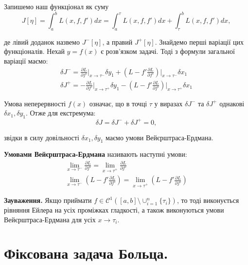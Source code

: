 \documentclass[14pt]{extarticle}
\newcommand{\<}{\langle}
\renewcommand{\>}{\rangle}
\theoremstyle{mystyle}{\newtheorem{definition}{Definition}[section]}
\theoremstyle{mystyle}{\newtheorem{proposition}[definition]{Proposition}}
\theoremstyle{mystyle}{\newtheorem{theorem}[definition]{Theorem}}
\theoremstyle{mystyle}{\newtheorem{lemma}[definition]{Lemma}}
\theoremstyle{mystyle}{\newtheorem{corollary}[definition]{Corollary}}
\theoremstyle{mystyle}{\newtheorem*{remark}{Remark}}
\theoremstyle{mystyle}{\newtheorem*{remarks}{Remarks}}
\theoremstyle{mystyle}{\newtheorem*{example}{Example}}
\theoremstyle{mystyle}{\newtheorem*{examples}{Examples}}
\theoremstyle{definition}{\newtheorem*{exercise}{Exercise}}
\theoremstyle{cstyle}{\newtheorem*{cthm}{}}
\theoremstyle{warn}
\begin{document}
Запишемо наш функціонал як суму
\begin{equation}
    J[\eta] = \int_a^b L(x,f,f')dx = \int_a^{\tau}L(x,f,f')dx + \int_{\tau}^b L(x,f,f')dx,
\end{equation}

де лівий доданок назвемо $J^{-}[\eta]$, а правий $J^{+}[\eta]$. Знайдемо перші варіації цих функціоналів.
Нехай $y=f(x)$ є розв'язком задачі. Тоді з формули загальної варіації маємо:
\begin{gather}
    \delta J^{-} = \frac{\partial L}{\partial f'}\Big|_{x \to \tau^{-}}\delta y_1 + \left(L-f'\frac{\partial L}{\partial f'}\right)\Big|_{x \to \tau^-}\delta x_1 \\
    \delta J^{+} = -\frac{\partial L}{\partial f'}\Big|_{x \to \tau^{+}}\delta y_1 - \left(L-f'\frac{\partial L}{\partial f'}\right)\Big|_{x \to \tau^+}\delta x_1 
\end{gather}

Умова неперервності $f(x)$ означає, що в точці $\tau$ у виразах $\delta J^{-}$ та $\delta J^{+}$ однакові $\delta x_1,\delta y_1$. Отже для екстремума:
\begin{equation}
    \delta J = \delta J^{-} + \delta J^{+} = 0,
\end{equation}

звідки в силу довільності $\delta x_1,\delta y_1$ маємо умови Вейєрштраса-Ердмана.

\begin{definition}
\textbf{Умовами Вейєрштраса-Ердмана} називають наступні умови:
\begin{gather}
    \lim_{x \to \tau^-}\frac{\partial L}{\partial f'} = \lim_{x \to \tau^+}\frac{\partial L}{\partial f'} \\
    \lim_{x \to \tau^-}\left(L-f'\frac{\partial L}{\partial f'}\right) = \lim_{x \to \tau^+}\left(L-f'\frac{\partial L}{\partial f'}\right)
\end{gather}
\end{definition}

\textbf{Зауваження.} Якщо приймати $f \in \mathcal{C}^1\left([a,b] \setminus \cup_{i=1}^n \{\tau_i\}\right)$, то тоді виконується рівняння Ейлера 
на усіх проміжках гладкості, а також виконуються умови Вейєрштраса-Ердмана для усіх $x \to \tau_i$. 

\pagebreak

\section{Фіксована задача Больца.}
\end{document}
